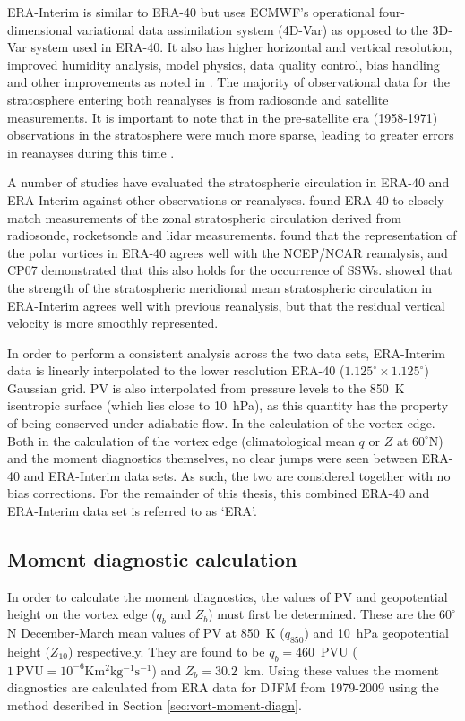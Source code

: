 ERA-Interim is similar to ERA-40 but uses ECMWF’s operational four-dimensional
variational data assimilation system (4D-Var) as opposed to the 3D-Var system
used in ERA-40. It also has higher horizontal and vertical resolution, improved
humidity analysis, model physics, data quality control, bias handling and other
improvements as noted in \citet{Simmons2007}. The majority of observational data
for the stratosphere entering both reanalyses is from radiosonde and satellite
measurements. It is important to note that in the pre-satellite era (1958-1971)
observations in the stratosphere were much more sparse, leading to greater
errors in reanayses during this time \citep{Uppala2005}. 

A number of studies have evaluated the stratospheric circulation in ERA-40 and
ERA-Interim against other observations or reanalyses. \citet{Randel2004} found
ERA-40 to closely match measurements of the zonal stratospheric circulation
derived from radiosonde, rocketsonde and lidar
measurements. \citet{Karpetchko2005} found that the representation of the polar
vortices in ERA-40 agrees well with the NCEP/NCAR reanalysis, and CP07
demonstrated that this also holds for the occurrence of
SSWs. \citet{Seviour2012} showed that the strength of the stratospheric
meridional mean stratospheric circulation in ERA-Interim agrees well with
previous reanalysis, but that the residual vertical velocity is more smoothly
represented.

In order to perform a consistent analysis across the two data sets, ERA-Interim
data is linearly interpolated to the lower resolution ERA-40
($1.125^{\circ} \times 1.125^{\circ}$) Gaussian grid. PV is also interpolated
from pressure levels to the 850~K isentropic surface (which lies close to
10~hPa), as this quantity has the property of being conserved under adiabatic
flow. In the calculation of the vortex edge. Both in the calculation of the
vortex edge (climatological mean $q$ or $Z$ at $60^{\circ}$N) and the moment
diagnostics themselves, no clear jumps were seen between ERA-40 and ERA-Interim
data sets. As such, the two are considered together with no bias
corrections. For the remainder of this thesis, this combined ERA-40 and
ERA-Interim data set is referred to as `ERA'. 


\subsection{Moment diagnostic calculation}
\label{sec:vort-geom-calc}

In order to calculate the moment diagnostics, the values of PV and geopotential
height on the vortex edge ($q_b$ and $Z_b$) must first be determined. These are
the $60^{\circ}$N December-March mean values of PV at 850~K ($q_{850}$) and
10~hPa geopotential height ($Z_{10}$) respectively. They are found to be
$q_b = 460$~PVU ($\mathrm{1~PVU = 10^{-6}Km^2kg^{-1}s^{-1}}$) and
$Z_b = 30.2$~km. Using these values the moment diagnostics are calculated from
ERA data for DJFM from 1979-2009 using the method described in Section
\ref{sec:vort-moment-diagn}.

